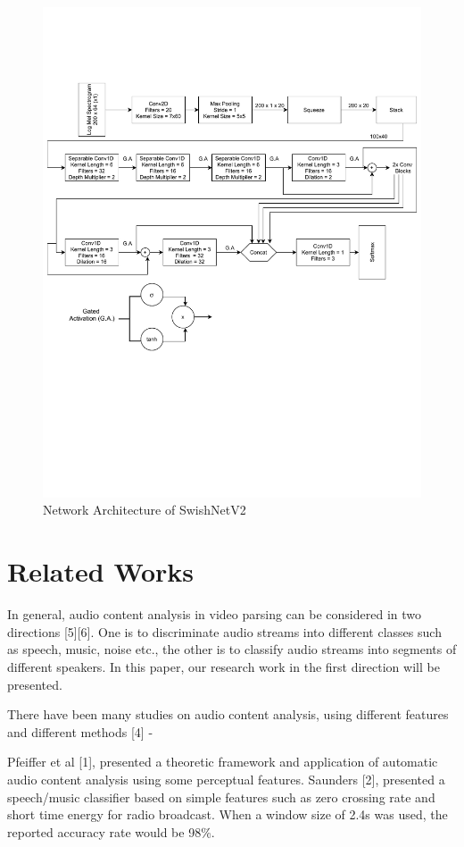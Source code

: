 \documentclass{article}
\begin{document}
\begin{figure}[!t]
	\centering
	\includegraphics[width=\textwidth, trim= 0 230 0 100, clip]{Network.pdf}
	\caption{Network Architecture of SwishNetV2}
	\label{fig:swishnet}
\end{figure}

\section{Related Works}
In general, audio content analysis in video parsing can be considered in two directions [5][6]. One is to discriminate audio streams into different classes such as speech, music, noise etc., the other is to classify audio streams into segments of different speakers. In this paper, our research work in the first direction will be presented. 

There have been many studies on audio content analysis, using different features and different methods [4] - 

Pfeiffer et al [1], presented a theoretic framework and application of automatic audio content analysis using some perceptual features. Saunders [2], presented a speech/music classifier based on simple features such as zero crossing rate and short time energy for radio broadcast. When a window size of 2.4s was used, the reported accuracy rate would be 98\%.  
\end{document}
